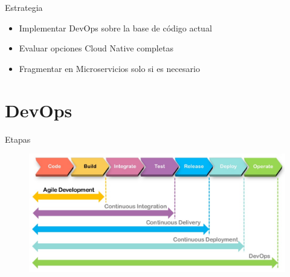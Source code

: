 \documentclass[aspectratio=169]{beamer}
\begin{document}
\begin{frame}{Estrategia}
\begin{itemize}
	\item Implementar DevOps sobre la base de código actual
    \item Evaluar opciones Cloud Native completas
    \item Fragmentar en Microservicios solo si es necesario
\end{itemize}
\end{frame}

{
    \section{DevOps}
}

\begin{frame}{Etapas}
\begin{figure}
	\centering
	\includegraphics[width=\linewidth]{Images/etapa1}
	\label{fig:etapa1}
\end{figure}
\end{frame}
\end{document}
